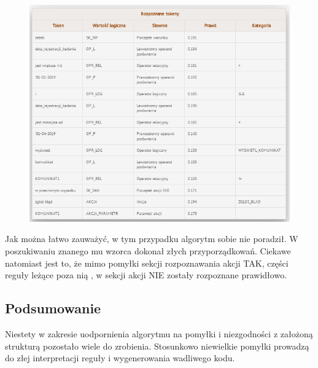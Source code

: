 \begin{figure}[H]
	\centering
	\includegraphics[scale=0.8]{img/app-eksperymenty/p6-1.png}
\end{figure}
Jak można łatwo zauważyć, w tym przypadku algorytm sobie nie poradził. W poszukiwaniu znanego mu wzorca dokonał złych przyporządkowań. Ciekawe natomiast jest to, że mimo pomyłki sekcji rozpoznawania akcji TAK, części reguły leżące poza nią , w sekcji akcji NIE zostały rozpoznane prawidłowo.
\subsection{Podsumowanie}
Niestety w zakresie uodpornienia algorytmu na pomyłki i niezgodności z założoną strukturą pozostało wiele do zrobienia. Stosunkowo niewielkie pomyłki prowadzą do złej interpretacji reguły i wygenerowania wadliwego kodu.